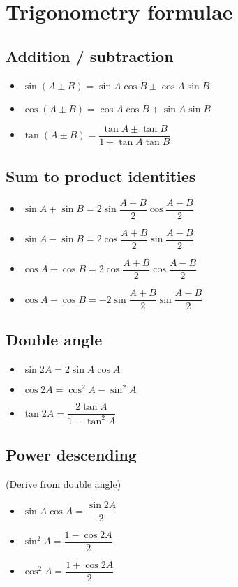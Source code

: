 \section{Trigonometry formulae}
\subsection{Addition / subtraction}
\begin{itemize}
    \item $\sin (A \pm B) = \sin A \cos B \pm \cos A \sin B$
    \item $\cos (A \pm B) = \cos A \cos B \mp \sin A \sin B$
    \item $\tan (A \pm B) = \dfrac{\tan A \pm \tan B}{1 \mp \tan A \tan B}$
\end{itemize}
\subsection{Sum to product identities}
\begin{itemize}
    \item $\sin A + \sin B = 2\sin \dfrac{A+B}{2} \cos\dfrac{A-B}{2}$
    \item $\sin A - \sin B = 2\cos \dfrac{A+B}{2} \sin\dfrac{A-B}{2}$
    \item $\cos A + \cos B = 2\cos \dfrac{A+B}{2} \cos\dfrac{A-B}{2}$
    \item $\cos A - \cos B = -2\sin \dfrac{A+B}{2} \sin\dfrac{A-B}{2}$
\end{itemize}
\subsection{Double angle}
\begin{itemize}
    \item $\sin 2A = 2\sin A \cos A$
    \item $\cos 2A = \cos^2 A - \sin^2 A$
    \item $\tan 2A = \dfrac{2\tan A}{1-\tan^2 A}$
\end{itemize}
\subsection{Power descending}
(Derive from double angle)
\begin{itemize}
    \item $\sin A \cos A = \dfrac{\sin2A}{2}$
    \item $\sin^2 A = \dfrac{1-\cos2A}{2}$
    \item $\cos^2 A = \dfrac{1+\cos2A}{2}$
\end{itemize}
